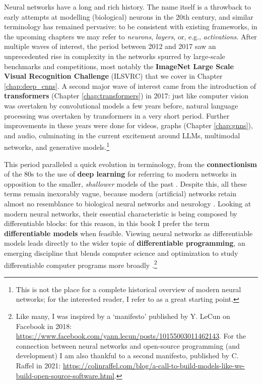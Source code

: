 Neural networks have a long and rich history. The name itself is a throwback to early attempts at modelling (biological) neurons in the 20th century, and similar terminology has remained pervasive: to be consistent with existing frameworks, in the upcoming chapters we may refer to \textit{neurons}, \textit{layers}, or, e.g., \textit{activations}. After multiple waves of interest, the period between 2012 and 2017 saw an unprecedented rise in complexity in the networks spurred by large-scale benchmarks and competitions, most notably the \textbf{ImageNet Large Scale Visual Recognition Challenge} (ILSVRC) that we cover in Chapter \ref{chap:deep_cnns}. A second major wave of interest came from the introduction of \textbf{transformers} (Chapter \ref{chap:transformers}) in 2017: just like computer vision was overtaken by convolutional models a few years before, natural language processing was overtaken by transformers in a very short period. Further improvements in these years were done for videos, graphs (Chapter \ref{chap:gnns}), and audio, culminating in the current excitement around LLMs, multimodal networks, and generative models.\footnote{This is not the place for a complete historical overview of modern neural networks; for the interested reader, I refer to \cite{metz2022genius} as a great starting point.}

This period paralleled a quick evolution in terminology, from the \textbf{connectionism} of the 80s \cite{rumelhart1986general} to the use of \textbf{deep learning} for referring to modern networks in opposition to the smaller, \textit{shallower} models of the past \cite{bengio2009learning,lecun2015deep}. Despite this, all these terms remain inexorably vague, because modern (artificial) networks retain almost no resemblance to biological neural networks and neurology \cite{zador2023catalyzing}. Looking at modern neural networks, their essential characteristic is being composed by differentiable blocks: for this reason, in this book I prefer the term \textbf{differentiable models} when feasible. Viewing neural networks as differentiable models leads directly to the wider topic of \textbf{differentiable programming}, an emerging discipline that blends computer science and optimization to study differentiable computer programs more broadly \cite{blondel2024elements}.\footnote{Like many, I was inspired by a `manifesto' published by Y. LeCun on Facebook in 2018: \url{https://www.facebook.com/yann.lecun/posts/10155003011462143}. For the connection between neural networks and open-source programming (and development) I am also thankful to a second manifesto, published by C. Raffel in 2021: {\url{https://colinraffel.com/blog/a-call-to-build-models-like-we-build-open-source-software.html}}.}

